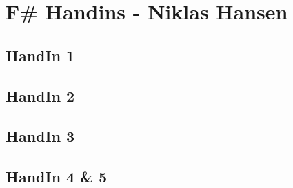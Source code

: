 \section{F\# Handins - Niklas Hansen}
\label{Appendix_FSharp_Niklas}

\subsection{HandIn 1}
\label{Appendix_FSharp_Niklas_1}
\subsection{HandIn 2}
\label{Appendix_FSharp_Niklas_2}
\subsection{HandIn 3}
\label{Appendix_FSharp_Niklas_3}
\subsection{HandIn 4 \& 5}
\label{Appendix_FSharp_Niklas_4and5}